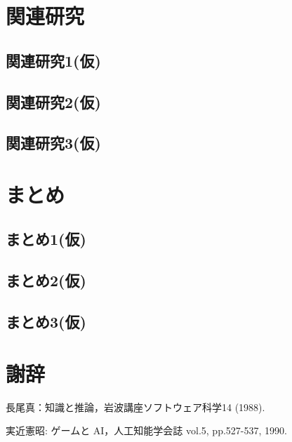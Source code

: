 \documentclass{jsarticle}
\begin{document}
\section{関連研究}
\subsection{関連研究1(仮)}
\subsection{関連研究2(仮)}
\subsection{関連研究3(仮)}
\section{まとめ}
\subsection{まとめ1(仮)}
\subsection{まとめ2(仮)}
\subsection{まとめ3(仮)}
\section{謝辞}

\newpage 

\begin{thebibliography}{}

 長尾真：知識と推論，岩波講座ソフトウェア科学14 (1988). 

 実近憲昭: ゲームと AI，人工知能学会誌 vol.5, pp.527-537, 1990.

\end{thebibliography}
\end{document}
